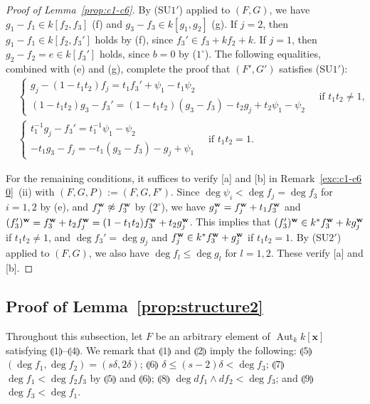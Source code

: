 \documentclass{amsart}
\theoremstyle{plain}
\theoremstyle{definition}
\newcommand{\Aut }{\mathop{\mathrm{Aut}}\nolimits}
\newcommand{\x}{{\boldsymbol x}}
\newcommand{\w}{{\bf w}}
\newcommand{\kx}{k[\x]}
\begin{document}
\begin{proof}[Proof of Lemma~{\rm \ref{prop:c1-c6}}]
By (SU$1'$) applied to $(F,G)$, 
we have 
$g_1-f_1\in k[f_2,f_3]$ (f) 
and $g_3-f_3\in k[g_1,g_2]$ (g). 
If $j=2$, then 
$g_1-f_1\in 
k[f_2,f_3']$ 
holds by (f), 
since $f_3'\in f_3+kf_2+k$. 
If $j=1$, then $g_2-f_2=e\in k[f_3']$ holds, 
since $b=0$ by ($1^\circ $). 
The following equalities, 
combined with (e) and (g), 
complete the proof that $(F',G')$ satisfies (SU$1'$): 
\begin{align*}
&\left\{ \!\!\begin{array}{l}
g_j-(1-t_1t_2)f_j
=t_1f_3'+\psi _1-t_1\psi _2\\
(1-t_1t_2)g_3-f_3'
=(1-t_1t_2)(g_3-f_3)-t_2g_j+t_2\psi _1-\psi _2 
\end{array}\right.\quad \text{if $t_1t_2\ne 1$},\\
&\left\{  \!\!\begin{array}{l}
t_1^{-1}g_j-f_3'
=t_1^{-1}\psi _1-\psi _2 \\
-t_1g_3-f_j
=-t_1(g_3-f_3)-g_j+\psi _1
\end{array}\right.\quad \text{if $t_1t_2=1$}. 
\end{align*}


For the remaining conditions, 
it suffices to verify [a] and [b] in Remark~\ref{exc:c1-c6 0}~(ii) 
with $(F,G,P):=(F,G,F')$. 
Since 
$\deg \psi _i<\deg f_j=\deg f_3$ for $i=1,2$ by (e), 
and $f_j^{\w }\not\approx f_3^{\w }$ by ($2^\circ $), 
we have 
$g_j^{\w }=f_j^{\w }+t_1f_3^{\w }$ and 
$(f_3')^{\w }
=f_3^{\w }+t_2f_j^{\w }
=(1-t_1t_2)f_3^{\w }+t_2g_j^{\w }$. 
This implies that 
$(f_3')^{\w }\in k^*f_3^{\w }+kg_j^{\w }$ 
if $t_1t_2\ne 1$, and 
$\deg f_3'=\deg g_j$ and $f_j^{\w }\in k^*f_3^{\w }+g_j^{\w }$ 
if $t_1t_2=1$. 
By (SU$2'$) applied to $(F,G)$, 
we also have $\deg f_l\le \deg g_l$ for $l=1,2$. 
These verify [a] and [b]. 
\end{proof}





\subsection{Proof of Lemma~\ref{prop:structure2}}
\label{sect:proof of key lemma}


Throughout this subsection, 
let $F$ be an arbitrary element of $\Aut _k\kx $ satisfying 
$\llparenthesis 1 \rrparenthesis$--$\llparenthesis 4 \rrparenthesis$. 
We remark that 
$\llparenthesis 1 \rrparenthesis$ and $\llparenthesis 2 \rrparenthesis$ 
imply the following: 
$\llparenthesis 5 \rrparenthesis$ 
$(\deg f_1,\deg f_2)=(s\delta ,2\delta )$; 
$\llparenthesis 6 \rrparenthesis$ 
$\delta \le (s-2)\delta <\deg f_3$; 
$\llparenthesis 7 \rrparenthesis$ 
$\deg f_1<\deg f_2f_3$ 
by $\llparenthesis 5 \rrparenthesis$ and $\llparenthesis 6 \rrparenthesis$; 
$\llparenthesis 8 \rrparenthesis$ $\deg df_1\wedge df_2<\deg f_3$; and 
$\llparenthesis 9 \rrparenthesis$ $\deg f_3<\deg f_1$. 
\end{document}
